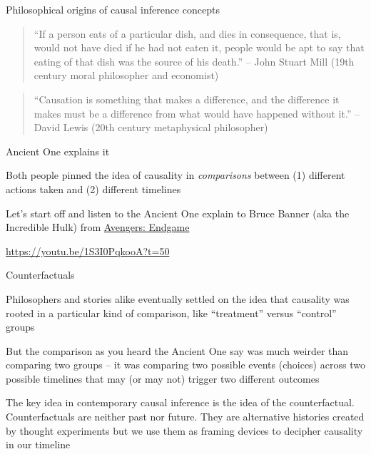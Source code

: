 \documentclass{beamer}
\begin{document}
\begin{frame}{Philosophical origins of causal inference concepts}

  \begin{quote}
    ``If a person eats of a particular dish, and dies in consequence, that is, would not have died if he had not eaten it, people would be apt to say that eating of that dish was the source of his death.'' -- John Stuart Mill (19th century moral philosopher and economist)
  \end{quote}

  \bigskip
  
    \begin{quote}
    ``Causation is something that makes a difference, and the difference it makes must be a difference from what would have happened without it.'' -- David Lewis (20th century metaphysical philosopher)
  \end{quote}

\end{frame}



\begin{frame}{Ancient One explains it}

  Both people pinned the idea of causality in \emph{comparisons} between (1) different actions taken and (2) different timelines
  
  \bigskip
  
  Let's start off and listen to the Ancient One explain to Bruce Banner (aka the Incredible Hulk) from \underline{Avengers: Endgame}
  
  \bigskip
  
  \url{https://youtu.be/1S3I0PqkooA?t=50}
  
  \end{frame}
  
  \begin{frame}{Counterfactuals}
  
  Philosophers and stories alike eventually settled on the idea that causality was rooted in a particular kind of comparison, like ``treatment'' versus ``control'' groups
  
  \bigskip
  
  But the comparison as you heard the Ancient One say was much weirder than comparing two groups -- it was comparing two possible events (choices) across two possible timelines that may (or may not) trigger two different outcomes
  
  \bigskip
  
  The key idea in contemporary causal inference is the idea of the counterfactual. Counterfactuals are neither past nor future.  They are alternative histories created by thought experiments but we use them as framing devices to decipher causality in our timeline

\end{frame}
\end{document}
